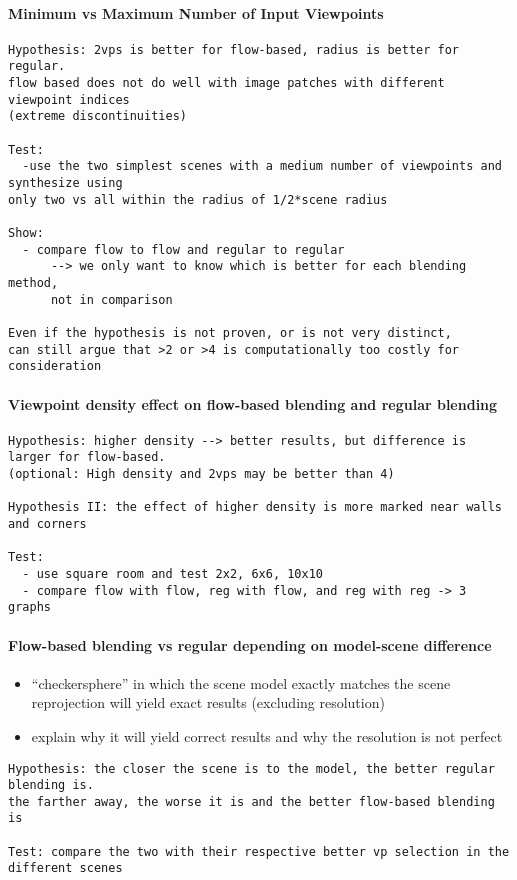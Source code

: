 \paragraph{Minimum vs Maximum Number of Input Viewpoints}
\begin{verbatim}
Hypothesis: 2vps is better for flow-based, radius is better for regular.
flow based does not do well with image patches with different viewpoint indices
(extreme discontinuities)

Test: 
  -use the two simplest scenes with a medium number of viewpoints and synthesize using
only two vs all within the radius of 1/2*scene radius

Show: 
  - compare flow to flow and regular to regular
      --> we only want to know which is better for each blending method,
      not in comparison

Even if the hypothesis is not proven, or is not very distinct,
can still argue that >2 or >4 is computationally too costly for consideration

\end{verbatim}

\paragraph{Viewpoint density effect on flow-based blending and regular blending}
\begin{verbatim}
Hypothesis: higher density --> better results, but difference is larger for flow-based.
(optional: High density and 2vps may be better than 4)

Hypothesis II: the effect of higher density is more marked near walls and corners

Test:
  - use square room and test 2x2, 6x6, 10x10
  - compare flow with flow, reg with flow, and reg with reg -> 3 graphs

\end{verbatim}

\paragraph{Flow-based blending vs regular depending on model-scene difference}
\begin{itemize}
  \item ``checkersphere'' in which the scene model exactly matches the scene
    \ar reprojection will yield exact results (excluding resolution)
  \item explain why it will yield correct results and why the resolution is not perfect
\end{itemize}
\begin{verbatim}
Hypothesis: the closer the scene is to the model, the better regular blending is.
the farther away, the worse it is and the better flow-based blending is

Test: compare the two with their respective better vp selection in the different scenes

\end{verbatim}


